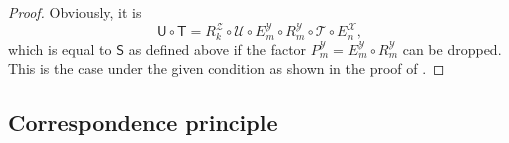 \documentclass[a4paper]{paper}
\newcommand{\Spc}[1]{\mathscr{#1}}
\newcommand{\Op}[1]{\mathcal{#1}}
\newcommand{\DiscOp}[1]{\mathsf{#1}}
\newcommand*{\EXT}[2]{\ensuremath{E_{#1}^{#2}}}
\newcommand*{\REST}[2]{\ensuremath{R_{#1}^{#2}}}
\newcommand*{\PROJ}[2]{\ensuremath{P_{#1}^{#2}}}
\newcommand*{\RmY}{\ensuremath{\REST{m}{\Spc{Y}}}}
\newcommand*{\EnX}{\ensuremath{\EXT{n}{\Spc{X}}}}
\newcommand*{\EmY}{\ensuremath{\EXT{m}{\Spc{Y}}}}
\newcommand*{\PmY}{\ensuremath{\PROJ{m}{\Spc{Y}}}}
\begin{document}
\begin{proof}
 Obviously, it is
 \begin{equation*}
  \DiscOp{U} \circ \DiscOp{T} = \REST{k}{\Spc{Z}} \circ \Op{U} \circ \EmY \circ \RmY \circ \Op{T} \circ \EnX,
 \end{equation*}
 which is equal to $\DiscOp{S}$ as defined above if the factor $\PmY = \EmY \circ \RmY$ can be dropped. This is the 
 case under the given condition as shown in the proof of .
\end{proof}



\subsection{Correspondence principle}
\label{subsec:discr:corresp}
\end{document}
